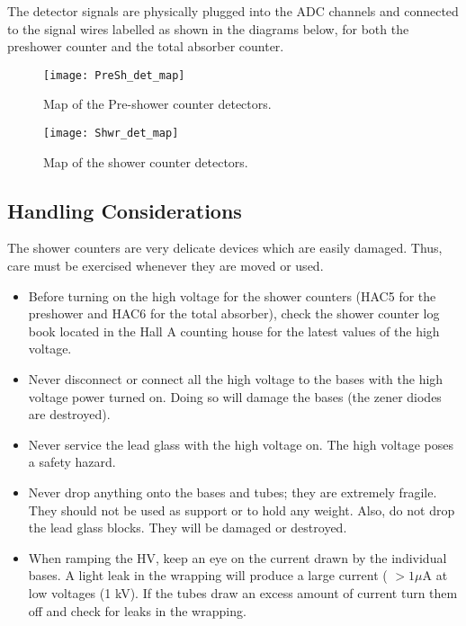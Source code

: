 The detector signals are physically plugged into the ADC channels
 and connected to the signal wires labelled as shown in the
 diagrams below,
 for both the preshower counter and the total absorber counter.
 
\begin{figure}
\begin{center}
\texttt{[image: PreSh\_det\_map]}
{\linespread{1.}
\caption[Detectors: Map of Pre-shower detector]{Map of the Pre-shower counter detectors.}
\label{fig:pre_map_}}
\end{center}
\end{figure}

\begin{figure}
\begin{center}
\texttt{[image: Shwr\_det\_map]}
{\linespread{1.}
\caption[Detectors: Map of shower detector]{Map of the shower counter detectors.}
\label{fig:ta_map}}
\end{center}
\end{figure}

\subsection{Handling Considerations}

The shower counters are very delicate devices which are easily damaged.
Thus, care must be exercised whenever they are moved or used.

\begin{itemize}
\item{Before turning on the high voltage for the shower counters (HAC5 for the preshower 
and HAC6 for the total absorber), check the shower counter log book located in the Hall 
A counting house for the latest values of the high voltage.}

\item{Never disconnect or connect all the high voltage to the bases with the
high voltage power turned on.  Doing so will damage the bases (the zener diodes
are destroyed).}

\item{Never service the lead glass with the high voltage on.  The
high voltage poses a safety hazard.}

\item{Never drop anything onto the bases and tubes; they are extremely fragile.  
They should not be used as support or to hold any weight.  Also, do not drop
the lead glass blocks.  They will be damaged or
destroyed.}

\item{When ramping the HV, keep an eye on the current drawn by the
individual bases.  A light leak in the wrapping will produce a large current
( $ > 1 \mu$A at low voltages (1 kV).  If the tubes draw an excess amount of current
turn them off and check for leaks in the wrapping.}
\end{itemize}


